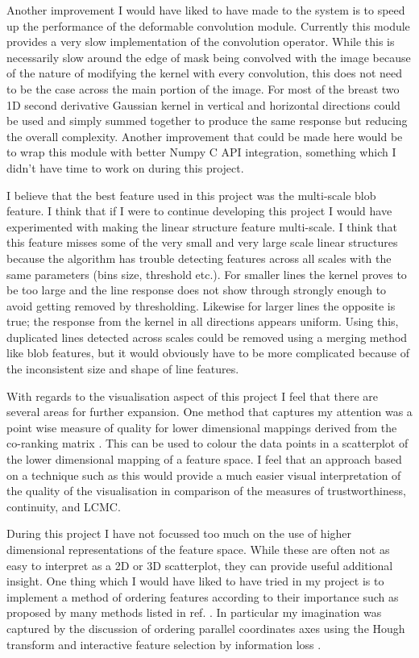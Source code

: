 Another improvement I would have liked to have made to the system is to speed up the performance of the deformable convolution module. Currently this module provides a very slow implementation of the convolution operator. While this is necessarily slow around the edge of mask being convolved with the image because of the nature of modifying the kernel with every convolution, this does not need to be the case across the main portion of the image. For most of the breast two 1D second derivative Gaussian kernel in vertical and horizontal directions could be used and simply summed together to produce the same response but reducing the overall complexity. Another improvement that could be made here would be to wrap this module with better Numpy C API integration, something which I didn't have time to work on during this project.

I believe that the best feature used in this project was the multi-scale blob feature. I think that if I were to continue developing this project I would have experimented with making the linear structure feature multi-scale. I think that this feature misses some of the very small and very large scale linear structures because the algorithm has trouble detecting features across all scales with the same parameters (bins size, threshold etc.). For smaller lines the kernel proves to be too large and the line response does not show through strongly enough to avoid getting removed by thresholding. Likewise for larger lines the opposite is true; the response from the kernel in all directions appears uniform. Using this, duplicated lines detected across scales could be removed using a merging method like blob features, but it would obviously have to be more complicated because of the inconsistent size and shape of line features.

With regards to the visualisation aspect of this project I feel that there are several areas for further expansion. One method that captures my attention was a point wise measure of quality for lower dimensional mappings derived from the co-ranking matrix \cite{mokbel2013visualizing}. This can be used to colour the data points in a scatterplot of the lower dimensional mapping of a feature space. I feel that an approach based on a technique such as this would provide a much easier visual interpretation of the quality of the visualisation in comparison of the measures of trustworthiness, continuity, and LCMC.

During this project I have not focussed too much on the use of higher dimensional representations of the feature space. While these are often not as easy to interpret as a 2D or 3D scatterplot, they can provide useful additional insight. One thing which I would have liked to have tried in my project is to implement a method of ordering features according to their importance such as proposed by many methods listed in ref. \cite{bertini2011quality}. In particular my imagination was captured by the discussion of ordering parallel coordinates axes using the Hough transform \cite{tatu2009combining} and interactive feature selection by information loss \cite{johansson2009interactive}.


